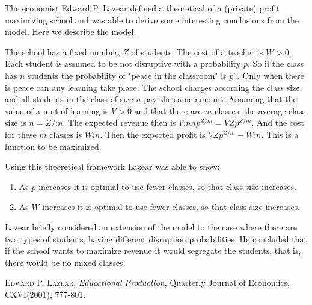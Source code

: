 \documentclass[12pt]{article}
\begin{document}


The economist Edward P. Lazear defined a theoretical  of a (private) profit
maximizing school and was able to derive some interesting conclusions from
the model. Here we describe the model.

The school has a fixed number, $Z$ of students. 
The cost of a teacher is $W>0$.
Each student is  assumed to be not disruptive with a probability $p$. So if
the class has $n$ students the probability of "peace in the classroom"
is $p^n$. Only when there is peace can any learning take place.
The school charges according the class size and all students in the class
of size $n$ pay the same amount. Assuming that the value of a unit of 
learning is $V>0$ and that there are $m$ classes, the average class
size is $n=Z/m$. The expected revenue then is 
$Vmn p^{Z/m} =VZp^{Z/m}$. And the cost for these $m$ classes is $Wm$.
Then the expected profit is $VZp^{Z/m}-Wm$. This is a function to be maximized.

Using this theoretical framework Lazear was able to show:
\begin{enumerate}
\item
As $p$ increases it is optimal to use fewer classes, so that class size increases.
\item
As $W$ increases it is optimal to use fewer classes, so that class size increases.
\end{enumerate}
Lazear briefly considered an extension of the model to the case where
there are two types of students, having different disruption probabilities. 
He concluded that if the school wants to maximize revenue it would segregate the 
students, that is, there would be no mixed classes. 

\begin{thebibliography}{10}
{\scshape Edward P. Lazear}, \emph{Educational Production}, Quarterly Journal of Economics, CXVI(2001), 777-801.
\end{thebibliography}
\end{document}
